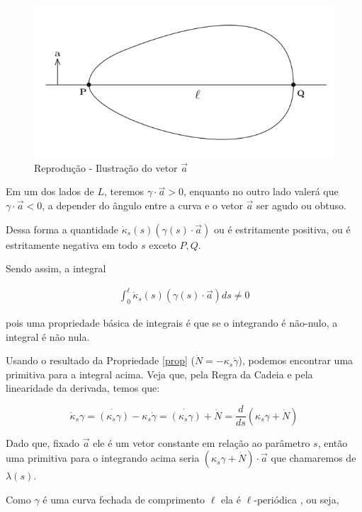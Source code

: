 \documentclass[12pt,letterpaper]{article}
\begin{document}
	\begin{figure}[!htb]
		\centering
		\label{fig:seg}
		\includegraphics[scale=0.6]{../images/fvt_fig1.png}
		\caption{Reprodução\cite{pressley2001elementary} - Ilustração do vetor $\vec a$}
	\end{figure}
	
	Em um dos lados de $L$, teremos $\gamma\cdotp\vec a>0$, enquanto no outro lado valerá que $ \gamma\cdotp \vec a <0$, a depender do ângulo entre a curva e o vetor $\vec a$ ser agudo ou obtuso. 
	
	Dessa forma a quantidade $\dot \kappa_s(s)(\gamma(s)\cdotp\vec a)$ ou é estritamente positiva, ou é estritamente negativa em todo $s$ exceto $P,Q$.
	
	Sendo assim, a integral
	
	\begin{align}
		\int_0^{\ell}\dot \kappa_s(s)(\gamma(s)\cdotp\vec a)ds\neq0\label{absurd}
	\end{align}

	pois uma propriedade básica de integrais é que se o integrando é não-nulo, a integral é não nula.
	
	Usando o resultado da Propriedade \ref{prop} ($\dot N=-\kappa_s\dot\gamma$), podemos encontrar uma primitiva para a integral acima. Veja que, pela Regra da Cadeia e pela linearidade da derivada, temos que:
	
	$$\dot\kappa_s\gamma = \dot{(\kappa_s\gamma)}-\kappa_s\dot\gamma=\dot{(\kappa_s\gamma)}+\dot N=\dfrac{d}{ds}(\kappa_s\gamma+\dot N)$$
	
	Dado que, fixado $\vec a$ ele é um vetor constante em relação ao parâmetro $s$, então uma primitiva para o integrando acima seria $(\kappa_s\gamma+\dot N)\cdotp \vec a$ que chamaremos de $\lambda(s)$.
	
	Como $\gamma$ é uma curva fechada de comprimento $\ell$ ela é $\ell$-periódica \cite{pressley2001elementary}, ou seja,
	
\end{document}
